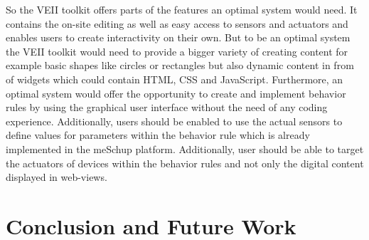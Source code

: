 
So the VEII toolkit offers parts of the features an optimal system would need. It contains the on-site editing as well as easy access to sensors and actuators and enables users to create interactivity on their own. But to be an optimal system the VEII toolkit would need to provide a bigger variety of creating content for example basic shapes like circles or rectangles but also dynamic content in from of widgets which could contain HTML, CSS and JavaScript. Furthermore, an optimal system would offer the opportunity to create and implement behavior rules by using the graphical user interface without the need of any coding experience. Additionally, users should be enabled to use the actual sensors to define values for parameters within the behavior rule which is already implemented in the meSchup platform. Additionally, user should be able to target the actuators of devices within the behavior rules and not only the digital content displayed in web-views. 

\iffalse
- optimales system:
	- mehr möglichkeiten inhalt zu erstellen (shapes)
		- erweiterung der display geräte -> nicht nur webview, sondern hardware (vibration) 
	- hauptsächlich verbesserungsbedarf im regel teil.
		- erstellung von regeln mit code durch nicht experten
		- einfaches drag and drop system
		- möglichkeiten regeln zu teilen
\fi


\chapter{Conclusion and Future Work}
\label{chap:conclusion}

